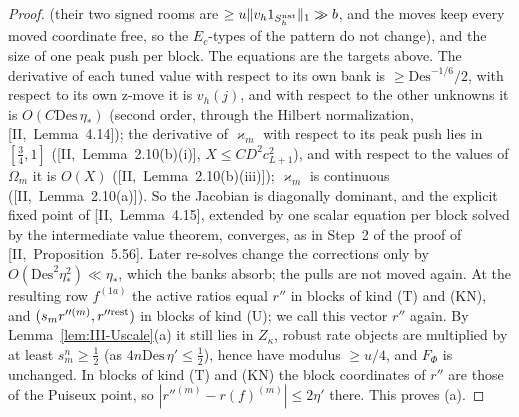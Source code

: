 \documentclass[10pt]{amsart}
\theoremstyle{definition}
\theoremstyle{remark}
\begin{document}
\begin{proof}
(their two signed rooms are $\ge u\|v_h1_{S^{\rm nat}_h}\|_1\gg b$, and the
moves keep every moved coordinate free, so the $E_c$-types of the pattern
do not change), and the size of one peak push per block.  The equations
are the targets above.  The derivative of each tuned value with respect
to its own bank is $\ge\mathrm{Des}^{-1/6}/2$, with respect to its own z-move
it is $v_h(j)$, and with respect to the other unknowns it is
$O(C\mathrm{Des}\,\eta_*)$ (second order, through the Hilbert normalization,
[II,~Lemma~4.14]); the derivative of $\varkappa_m$ with respect to its peak
push lies in $[\frac34,1]$ ([II,~Lemma~2.10(b)(i)], $X\le CD^2c_{L+1}^2$), and
with respect to the values of $\Omega_m$ it is $O(X)$
([II,~Lemma~2.10(b)(iii)]); $\varkappa_m$ is continuous
([II,~Lemma~2.10(a)]).  So the Jacobian is diagonally dominant, and the
explicit fixed point of [II,~Lemma~4.15], extended by one scalar equation
per block solved by the intermediate value theorem, converges, as in
Step~2 of the proof of [II,~Proposition~5.56].  Later re-solves change the
corrections only by $O(\mathrm{Des}^2\eta_*^2)\ll\eta_*$, which the banks absorb;
the pulls are not moved again.  At the resulting row $f^{(1a)}$ the active
ratios equal $r''$ in blocks of kind (T) and (KN), and $(s_mr''^{(m)},
r''^{\rm rest})$ in blocks of kind (U); we call this vector $r''$ again.  By
Lemma~\ref{lem:III-Uscale}(a) it still lies in $Z_\kappa$, robust rate objects
are multiplied by at least $s_m^n\ge\frac12$ (as $4n\mathrm{Des}\,\eta'\le\frac12$),
hence have modulus $\ge u/4$, and $F_\Phi$ is unchanged.  In blocks of
kind (T) and (KN) the block coordinates of $r''$ are those of the Puiseux
point, so $|r''^{(m)}-r(f)^{(m)}|\le2\eta'$ there.  This proves (a).


\end{proof}
\end{document}
